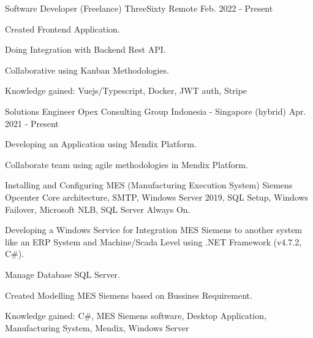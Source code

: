 

\begin{cventries}

  \cventry
  {Software Developer (Freelance)} %
  {ThreeSixty} %
  {Remote} %
  {Feb. 2022 - Present} %
  {
    \begin{cvitems} %
      \item {Created Frontend Application.}
      \item {Doing Integration with Backend Rest API.}
      \item {Collaborative using Kanban Methodologies.}
      \item {Knowledge gained: Vuejs/Typescript, Docker, JWT auth, Stripe}
    \end{cvitems}
  }
  
  \cventry
    {Solutions Engineer} %
    {Opex Consulting Group} %
    {Indonesia - Singapore (hybrid)} %
    {Apr. 2021 - Present} %
    {
      \begin{cvitems} %
        \item {Developing an Application using Mendix Platform.}
        \item {Collaborate team using agile methodologies in Mendix Platform.}
        \item {Installing and Configuring MES (Manufacturing Execution System) Siemens Opcenter Core architecture, SMTP, Windows Server 2019, SQL Setup, Windows Failover, Microsoft NLB, SQL Server Always On.}
        \item {Developing a Windows Service for Integration MES Siemens to another system like an ERP System and Machine/Scada Level using .NET Framework (v4.7.2, C\#).}
        \item {Manage Database SQL Server.}
        \item {Created Modelling MES Siemens based on Bussines Requirement.}
        \item {Knowledge gained: C\#, MES Siemens software, Desktop Application, Manufacturing System, Mendix, Windows Server}
      \end{cvitems}
    }


\end{cventries}
